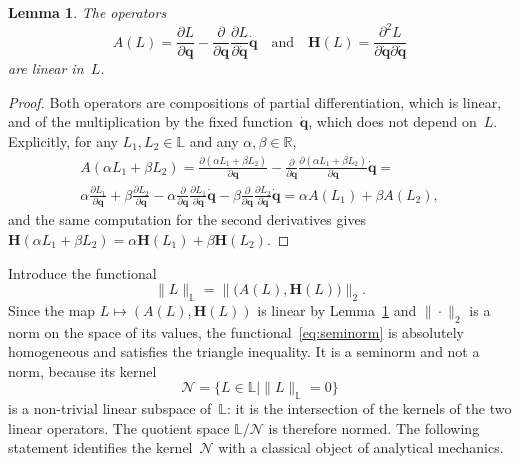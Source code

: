 \documentclass[sn-mathphys-num]{sn-jnl}
\theoremstyle{thmstylethree}
\theoremstyle{thmstyletwo}
\theoremstyle{thmstyleone}
\newtheorem{lemma}{Lemma}
\begin{document}
\begin{lemma} \label{lemma2}
The operators
\[
A (L) = \frac{\partial L}{\partial \mathbf{q}}-\frac{\partial}{\partial \mathbf{q}} \frac{\partial L}{\partial \dot{\mathbf{q}}} \dot{\mathbf{q}}
\quad\text{and}\quad
\mathbf{H}(L) = \frac{\partial^2 L}{\partial \dot{\mathbf{q}} \partial \dot{\mathbf{q}}}
\]
are linear in~$L$.
\end{lemma}
\begin{proof}
Both operators are compositions of partial differentiation, which is linear, and of the multiplication by the fixed function~$\dot{\mathbf{q}}$, which does not depend on~$L$. Explicitly, for any $L_1, L_2 \in \mathbb{L}$ and any $\alpha, \beta \in \mathbb{R}$,
\[
\begin{split}
A (\alpha L_1 + \beta L_2) =
\frac{\partial (\alpha L_1 + \beta L_2)}{\partial \mathbf{q}}-\frac{\partial}{\partial \mathbf{q}} \frac{\partial (\alpha L_1 + \beta L_2)}{\partial \dot{\mathbf{q}}} \dot{\mathbf{q}} =
\\
\alpha\frac{\partial  L_1 }{\partial \mathbf{q}} + \beta\frac{\partial L_2}{\partial \mathbf{q}} -  \alpha\frac{\partial}{\partial \mathbf{q}} \frac{\partial L_1}{\partial \dot{\mathbf{q}}}\dot{\mathbf{q}} -  \beta\frac{\partial}{\partial \mathbf{q}} \frac{\partial L_2}{\partial \dot{\mathbf{q}}} \dot{\mathbf{q}} =
\alpha A(L_1) + \beta A(L_2),
\end{split}
\]
and the same computation for the second derivatives gives $\mathbf{H}(\alpha L_1 + \beta L_2) = \alpha \mathbf{H}(L_1) + \beta \mathbf{H}(L_2)$.
\end{proof}

Introduce the functional
\begin{equation}
\label{eq:seminorm}
\|L\|_{\mathbb{L}} = \bigl\| \bigl(A(L), \mathbf{H}(L)\bigr) \bigr\|_{2}.
\end{equation}
Since the map $L \mapsto (A(L), \mathbf{H}(L))$ is linear by Lemma~\ref{lemma2} and $\|\cdot\|_2$ is a norm on the space of its values, the functional~\eqref{eq:seminorm} is absolutely homogeneous and satisfies the triangle inequality. It is a seminorm and not a norm, because its kernel
\[
\mathcal{N} = \{ L \in \mathbb{L} \mid \|L\|_{\mathbb{L}} = 0 \}
\]
is a non-trivial linear subspace of~$\mathbb{L}$: it is the intersection of the kernels of the two linear operators. The quotient space $\mathbb{L} / \mathcal{N}$ is therefore normed. The following statement identifies the kernel~$\mathcal{N}$ with a classical object of analytical mechanics.
\end{document}
